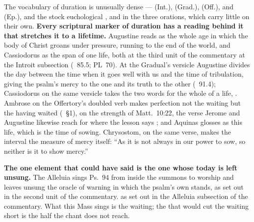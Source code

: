 The vocabulary of duration is unusually dense ---  (Int.),
 (Grad.),  (Off.),
 and  (Ep.), and the
stock euchological ,  and  in the
three orations, which carry little on their own. \textbf{Every scriptural marker of
duration has a reading behind it that stretches it to a lifetime.}
Augustine reads  as the whole age in which the body of Christ
groans under pressure, running to the end of the world, and Cassiodorus as the
span of one life, both
\ifdefined\TriptychSynthesisEdition
at the third unit of the commentary%
\else
at the Introit subsection%
\fi{} (~85.5; PL~70).
At the Gradual's versicle Augustine divides the day between the time when it
goes well with us and the time of tribulation, giving the psalm's mercy to the
one and its truth to the other (~91.4); Cassiodorus on the same
versicle takes the
two words for the whole of a life, . Ambrose on the Offertory's doubled verb makes perfection
not the waiting but the having waited (~§1), on the strength
of Matt.\ 10:22, the verse Jerome and Augustine likewise reach for where the
lesson says ; and Aquinas glosses  as
this life, which is the time of sowing. Chrysostom, on
the same verse, makes the interval the measure of mercy itself: ``As it is not
always in our power to sow, so neither is it to show mercy.''

\textbf{The one element that could have said  is the one whose today
is left unsung.} The Alleluia sings Ps.~94 from inside the summons to worship and
leaves unsung the oracle of warning in which the psalm's own 
stands,
\ifdefined\TriptychSynthesisEdition
as set out in the second unit of the commentary.%
\else
as set out in the Alleluia subsection of the commentary.%
\fi{}
What this Mass sings is the waiting; the  that would cut the waiting
short is the half the chant does not reach.

\label{triptych:brief-synthesis:end}
\clearpage
